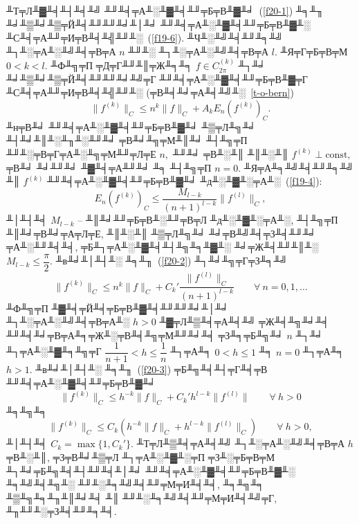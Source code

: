  ╨Т╤Л╨▓╨╡╨┤╨╡╨╝ ╨╜╨╡╤А╨░╨▓╨╡╨╜╤Б╤В╨▓╨╛~(\ref{f20-1}) ╨╕╨╖ ╨╛╨▒╨╛╨▒╤Й╨╡╨╜╨╜╨╛╨│╨╛ ╨╜╨╡╤А╨░╨▓╨╡╨╜╤Б╤В╨▓╨░
 ╨С╨╡╤А╨╜╤И╤В╨╡╨╣╨╜╨░~(\ref{f19-6}).  ╨Ч╨░╨╝╨╡╨╜╨╕╨╝  ╨┐╨░╤А╨░╨╝╨╡╤В╤А $n$ ╨╜╨░ ╨┐╨░╤А╨░╨╝╨╡╤В╤А  $l.$ ╨Я╤Г╤Б╤В╤М     $0<k<l.$
 ╨Ф╨╗╤П ╤Д╤Г╨╜╨║╤Ж╨╕╨╕  $f\in C^{(k)}_{{2\pi}}$
 ╨┐╨╛ ╨╛╨▒╨╛╨▒╤Й╨╡╨╜╨╜╨╛╨╝╤Г ╨╜╨╡╤А╨░╨▓╨╡╨╜╤Б╤В╨▓╤Г ╨С╨╡╤А╨╜╤И╤В╨╡╨╣╨╜╨░ (╤В╨╡╨╛╤А╨╡╨╝╨░~\ref{t-o-bern})
  \begin{equation}\label{f20-2}
 \|f^{(k)}\|_C\le n^k \|f\|_C+A_kE_n(f^{(k)})_C.
  \end{equation}
 ╨н╤В╨╛ ╨╜╨╡╤А╨░╨▓╨╡╨╜╤Б╤В╨▓╨╛ ╨▒╤Л╨╗╨╛ ╨┤╨╛╨║╨░╨╖╨░╨╜╨╛ ╤В╨╛╨╗╤М╨║╨╛ ╨┤╨╗╤П ╨╜╨░╤В╤Г╤А╨░╨╗╤М╨╜╤Л╤Е $n,$
 ╨╜╨╛ ╤В╨░╨║ ╨║╨░╨║ $f^{(k)}\perp \mbox{const},$ ╤В╨╛ ╨╛╨╜╨╛ ╨▓╨╡╤А╨╜╨╛ ╨╕ ╨┤╨╗╤П  $n=0.$
 ╨Я╤А╨╕╨╝╨╡╨╜╨╕╨╝ ╨║ $f^{(k)}$ ╨╜╨╡╤А╨░╨▓╨╡╨╜╤Б╤В╨▓╨╛ ╨д╨░╨▓╨░╤А╨░~(\ref{f19-4}):
 $$
 E_n(f^{(k)})_C\le \frac{M_{l-k}}{(n+1)^{l-k}}\|f^{(l)}\|_C,
 $$
╨│╨┤╨╡ $M_{l-k}$ -- ╨║╨╛╨╜╤Б╤В╨░╨╜╤В╤Л ╨д╨░╨▓╨░╤А╨░, ╨┤╨╗╤П ╨║╨╛╤В╨╛╤А╤Л╤Е, ╨║╨░╨║ ╨▒╤Л╨╗╨╛
╨╛╤В╨╝╨╡╤З╨╡╨╜╨╛ ╤А╨░╨╜╨╡╨╡, ╤Б╨┐╤А╨░╨▓╨╡╨┤╨╗╨╕╨▓╨░ ╨╛╤Ж╨╡╨╜╨║╨░ $M_{l-k}\le \dfrac{\pi}{2}.$
 ╨в╨╛╨│╨┤╨░ ╨╕╨╖~(\ref{f20-2}) ╨┐╨╛╨╗╤Г╤З╨╕╨╝
 \begin{equation}\label{f20-3}
 \|f^{(k)}\|_C\le
 n^k\|f\|_C+C_k'\frac{\|f^{(l)}\|_C}{(n+1)^{l-k}}\qquad \forall\
 n=0,1,\ldots
 \end{equation}
 ╨Ф╨╗╤П ╨▓╨╡╤Й╨╡╤Б╤В╨▓╨╡╨╜╨╜╨╛╨│╨╛ ╨┐╨░╤А╨░╨╝╨╡╤В╤А╨░ $h>0$ ╨▓╤Л╨▒╨╡╤А╨╡╨╝ ╤Ж╨╡╨╗╨╛╨╡ ╨╜╨╡╨╛╤В╤А╨╕╤Ж╨░╤В╨╡╨╗╤М╨╜╨╛╨╡ ╤З╨╕╤Б╨╗╨╛ $n$  ╨┐╨╛ ╨┐╤А╨░╨▓╨╕╨╗╤Г
 $\dfrac{1}{n+1}<
 h\le \dfrac{1}{n}$ ╨┐╤А╨╕ $0<h\le 1$ ╨╕ $n=0$ ╨┐╤А╨╕ $h>1.$
 ╨в╨╛╨│╨┤╨░ ╨╕╨╖~(\ref{f20-3}) ╤Б╨╗╨╡╨┤╤Г╨╡╤В  ╨╜╨╡╤А╨░╨▓╨╡╨╜╤Б╤В╨▓╨╛
 $$
 \|f^{(k)}\|_C\le h^{-k}\|f\|_C+C_k' h^{l-k}\|f^{(l)}\|\qquad \forall\
 h>0
 $$
 ╨╕╨╗╨╕
 \begin{equation}\label{f20-4}
 \|f^{(k)}\|_C\le C_k (h^{-k}\|f\|_C+h^{l-k}\|f^{(l)}\|_C)\qquad
 \forall\ h>0,
 \end{equation}
 ╨│╨┤╨╡ $C_k=\max\{1,C_k'\}.$
 ╨Т╤Л╨▒╨╡╤А╨╡╨╝ ╨┐╨░╤А╨░╨╝╨╡╤В╤А $h$ ╤В╨░╨║, ╤З╤В╨╛╨▒╤Л ╨┐╤А╨░╨▓╨░╤П ╤З╨░╤Б╤В╤М ╨┐╨╛╤Б╨╗╨╡╨┤╨╜╨╡╨│╨╛  ╨╜╨╡╤А╨░╨▓╨╡╨╜╤Б╤В╨▓╨░  ╨╕╨╝╨╡╨╗╨░  ╨╜╨░╨╕╨╝╨╡╨╜╤М╤И╨╡╨╡,
 ╨╕╨╗╨╕ ╨▒╨╗╨╕╨╖╨║╨╛╨╡ ╨║ ╨╜╨░╨╕╨╝╨╡╨╜╤М╤И╨╡╨╝╤Г,  ╨╖╨╜╨░╤З╨╡╨╜╨╕╨╡.

